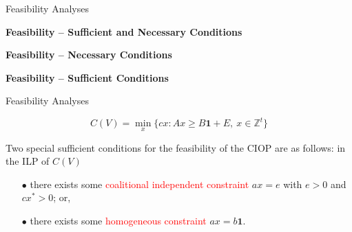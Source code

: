 \documentclass[14pt]{beamer}
\newcommand{\Z}{\mathbb{Z}}
\begin{document}
\begin{frame}{Feasibility Analyses}
\begin{theorem}\label{theorem:SAndN}
\justifying
\centering
\textbf{\rm Feasibility -- Sufficient and Necessary Conditions}
\end{theorem}
\begin{theorem}\label{theorem:necessary}
\justifying
\centering
\textbf{\rm Feasibility -- Necessary Conditions}
\end{theorem}
\begin{theorem}\label{theorem:sufficient}
\justifying
\centering
\textbf{\rm Feasibility -- Sufficient Conditions}
\end{theorem}
\end{frame}


\begin{frame}{Feasibility Analyses}
\vspace{-3mm}
\begin{shaded}
\vspace{-6mm}
\centering
\small
$$C(V) = \min_{x} \{ cx: Ax \geq B\textbf{1} + E, ~x \in \Z^{t} \}$$
\vspace{-8mm}
\end{shaded}
\vspace{-3mm}
\begin{corollary}\label{corollary:sufficient}
\justifying
 Two special sufficient conditions for the feasibility of the $\mathrm{CIOP}$ are as follows: in the ILP of $C(V)$
 ~~\\
\begin{itemize}
\item[$\bullet$] there exists some \textcolor{red}{coalitional independent constraint} $ax = e$ with $e>0$ and $cx^* > 0$; or,
~~\\
\item[$\bullet$] there exists some \textcolor{red}{homogeneous constraint} $ax = b\textbf{1}$.
\end{itemize}
\end{corollary}
\end{frame}
\end{document}
